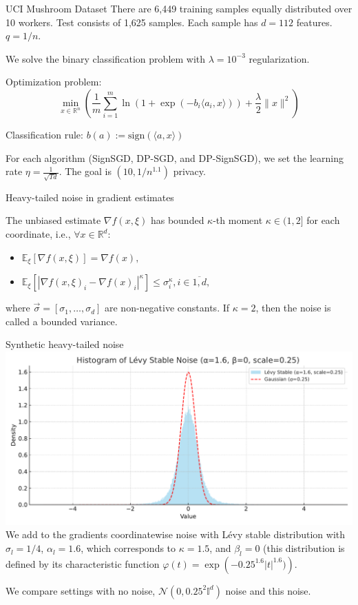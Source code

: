 \documentclass{beamer}
\newcommand{\EE}{\mathbb{E}}
\newcommand{\R}{\mathbb{R}}
\begin{document}
\begin{frame}{UCI Mushroom Dataset}
There are 6,449 training samples equally distributed over 10 workers. Test consists of 1,625 samples. Each sample has $d = 112$ features. $q = 1/n$.

We solve the binary classification problem with $\lambda = 10^{-3}$ regularization.

\bigskip

Optimization problem:
$$\min_{x \in \mathbb{R}^n} \left( \frac{1}{m} \sum_{i=1}^m \ln(1 + \exp(-b_i \langle a_i, x \rangle)) + \frac{\lambda}{2} \|x\|^2 \right)
$$

Classification rule:
$b(a) := \text{sign}(\langle a, x \rangle)$

\bigskip

For each algorithm (SignSGD, DP-SGD, and DP-SignSGD), we set the learning rate $\eta=\frac{1}{\sqrt{T d}}$. The goal is $(10, 1/n^{1.1})$ privacy.
\end{frame}
\begin{frame}{Heavy-tailed noise in gradient estimates}

    The unbiased estimate $\nabla f (x, \xi)$  has bounded $\kappa$-th moment $\kappa \in (1,2]$ for each coordinate, i.e., $\forall x \in \R^d$: 
    \begin{itemize}
        \item $\EE_\xi [\nabla f (x, \xi)] = \nabla f(x),$
        \item $\EE_\xi [|\nabla f (x, \xi)_i - \nabla f(x)_i|^\kappa] \leq \sigma_i^\kappa, i \in \overline{1,d},$
    \end{itemize}
    where $\Vec{\sigma} = [\sigma_1, \dots, \sigma_d]$ are non-negative constants.
    If $\kappa = 2$, then the noise is called a bounded variance. 

\end{frame}
\begin{frame}{Synthetic heavy-tailed noise}
\includegraphics[width=1.0\textwidth]{levy_stable_histogram} 
We add to the gradients coordinatewise noise with Lévy stable distribution with $\sigma_l = 1/4$, $\alpha_l=1.6$, which corresponds to $\kappa=1.5$, and $\beta_l=0$ (this distribution is defined by its characteristic function $\varphi(t)=\exp\left(-0.25^{1.6}|t|^{1.6})\right)$.

We compare settings with no noise, $\mathcal{N}(0, 0.25^2\mathbb{I}^d)$ noise and this noise.
\end{frame}
\end{document}
